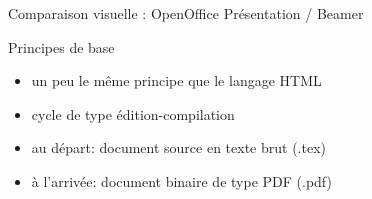 \documentclass{beamer}
\begin{document}
\begin{frame}[t]{Comparaison visuelle : OpenOffice Présentation / Beamer}

\setlength\fboxsep{0pt}
\setlength\fboxrule{0.5pt}

\centering
{}

\end{frame}




\begin{frame}{Principes de base}
    \begin{itemize}
        \item un peu le même principe que le langage HTML
        \item cycle de type édition-compilation
        \item au départ: document source en texte brut (.tex)
        \item à l'arrivée: document binaire de type PDF (.pdf)
    \end{itemize}
\end{frame}
\end{document}
